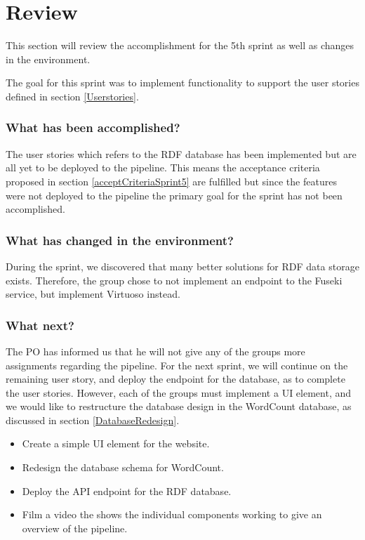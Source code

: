 \section{Review}
This section will review the accomplishment for the 5th sprint as well as changes in the \knox{} environment. 

The goal for this sprint was to implement functionality to support the user stories defined in section \ref{Userstories}. 

\subsubsection*{What has been accomplished?}
The user stories which refers to the RDF database has been implemented but are all yet to be deployed to the \knox{} pipeline. This means the acceptance criteria proposed in section \ref{acceptCriteriaSprint5} are fulfilled but since the features were not deployed to the pipeline the primary goal for the sprint has not been accomplished. 

\subsubsection*{What has changed in the environment?}
During the sprint, we discovered that many better solutions for RDF data storage exists. Therefore, the group chose to not implement an endpoint to the Fuseki service, but implement Virtuoso instead. 

\subsubsection*{What next?}
The PO has informed us that he will not give any of the \knox{} groups more assignments regarding the pipeline. 
For the next sprint, we will continue on the remaining user story, and deploy the endpoint for the database, as to complete the user stories. 
However, each of the \knox{} groups must implement a UI element, and we would like to restructure the database design in the WordCount database, as discussed in section \ref{DatabaseRedesign}.

\begin{itemize}
    \item Create a simple UI element for the \knox{} website.
    \item Redesign the database schema for WordCount.
    \item Deploy the API endpoint for the RDF database.
    \item Film a video the shows the individual components working to give an overview of the pipeline.
\end{itemize}

